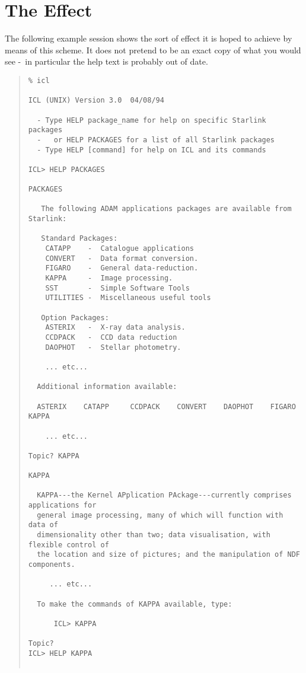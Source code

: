 \documentclass[twoside,11pt]{article}
\newcommand{\xlabel}[1]{}
\renewcommand{\_}{\texttt{\symbol{95}}}
\newcommand{\dash}{--}
\renewcommand{\dash}{-}
\begin{document}
\section{\xlabel{the_effect}The Effect}
\label{effect}
The following example session shows the sort of effect it is hoped to achieve
by means of this scheme. It does not pretend to be an exact copy of what you
would see \dash\ in particular the help text is probably out of date.
\small
\begin{quote}
\begin{verbatim}
% icl

ICL (UNIX) Version 3.0  04/08/94

  - Type HELP package_name for help on specific Starlink packages
  -   or HELP PACKAGES for a list of all Starlink packages
  - Type HELP [command] for help on ICL and its commands

ICL> HELP PACKAGES

PACKAGES

   The following ADAM applications packages are available from Starlink:

   Standard Packages:
    CATAPP    -  Catalogue applications
    CONVERT   -  Data format conversion.
    FIGARO    -  General data-reduction.
    KAPPA     -  Image processing.
    SST       -  Simple Software Tools
    UTILITIES -  Miscellaneous useful tools

   Option Packages:
    ASTERIX   -  X-ray data analysis.
    CCDPACK   -  CCD data reduction
    DAOPHOT   -  Stellar photometry.

    ... etc...

  Additional information available:

  ASTERIX    CATAPP     CCDPACK    CONVERT    DAOPHOT    FIGARO     KAPPA

    ... etc...

Topic? KAPPA

KAPPA

  KAPPA---the Kernel APplication PAckage---currently comprises applications for
  general image processing, many of which will function with data of
  dimensionality other than two; data visualisation, with flexible control of
  the location and size of pictures; and the manipulation of NDF components.

     ... etc...

  To make the commands of KAPPA available, type:

      ICL> KAPPA

Topic?
ICL> HELP KAPPA


\end{verbatim}
\end{quote}
\end{document}
